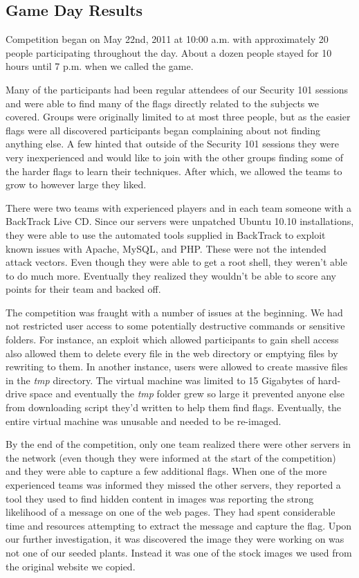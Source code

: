 \documentclass[10pt]{article}
\begin{document}
\subsection{Game Day Results}
Competition began on May 22nd, 2011 at 10:00 a.m. with approximately 20 people
participating throughout the day. About a dozen people stayed for 10 hours until
7 p.m. when we called the game. 

Many of the participants had been regular attendees of our Security 101 sessions
and were able to find many of the flags directly related to the subjects we
covered. Groups were originally limited to at most three people, but as the
easier flags were all discovered participants began complaining about not
finding anything else. A few hinted that outside of the Security 101 sessions
they were very inexperienced and would like to join with the other groups
finding some of the harder flags to learn their techniques. After which, we
allowed the teams to grow to however large they liked.

There were two teams with experienced players and in each team someone with a
BackTrack Live CD. Since our servers were unpatched Ubuntu 10.10 installations,
they were able to use the automated tools supplied in BackTrack to exploit
known issues with Apache, MySQL, and PHP. These were not the intended attack
vectors. Even though they were able to get a root shell, they weren't able to do
much more. Eventually they realized they wouldn't be able to score any points
for their team and backed off. 

The competition was fraught with a number of issues at the beginning. We had not
restricted user access to some potentially destructive commands or sensitive
folders. For instance, an exploit which allowed participants to gain shell
access also allowed them to delete every file in the web directory or emptying
files by rewriting to them. In another instance, users were allowed to create
massive files in the \textit{tmp} directory. The virtual machine was limited to
15 Gigabytes of hard-drive space and eventually the \textit{tmp} folder grew so
large it prevented anyone else from downloading script they'd written to help
them find flags. Eventually, the entire virtual machine was unusable and needed
to be re-imaged.

By the end of the competition, only one team realized there were other servers
in the network (even though they were informed at the start of the competition)
and they were able to capture a few additional flags. When one of the more
experienced teams was informed they missed the other servers, they reported a
tool they used to find hidden content in images was reporting the strong
likelihood of a message on one of the web pages. They had spent considerable
time and resources attempting to extract the message and capture the flag. Upon
our further investigation, it was discovered the image they were working on was
not one of our seeded plants. Instead it was one of the stock images we used
from the original website we copied.
\end{document}
